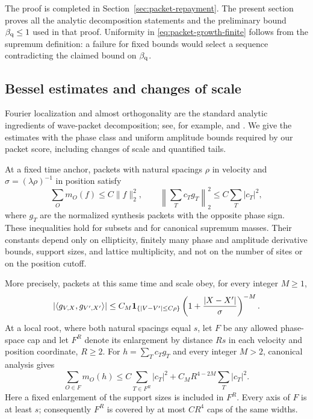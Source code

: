 The proof is completed in Section~\ref{sec:packet-repayment}.
The present section proves all the analytic decomposition statements
and the preliminary bound \(\beta_{\mathrm q}\le1\) used in that proof.
Uniformity in \eqref{eq:packet-growth-finite} follows from the supremum
definition: a failure for fixed bounds would select a sequence
contradicting the claimed bound on \(\beta_{\mathrm q}\).

\subsection{Bessel estimates and changes of scale}

Fourier localization and almost orthogonality are the standard analytic
ingredients of wave-packet decomposition; see, for example,
\citet{Tao2003} and
\citet{GuoOhWangWuZhang2025}. We give the estimates
with the phase class and uniform amplitude bounds required by our
packet score, including changes of scale and quantified tails.

\begin{lemma}
\label{lem:packet-bessel}
At a fixed time anchor, packets with natural spacings \(\rho\) in
velocity and \(\sigma=(\lambda\rho)^{-1}\) in position satisfy
\begin{equation}
 \sum_O m_O(f)\le C\|f\|_2^2,\qquad
 \left\|\sum_T c_T g_T\right\|_2^2\le C\sum_T|c_T|^2,
 \label{eq:packet-bessel}
\end{equation}
where \(g_T\) are the normalized synthesis packets with the opposite
phase sign.  These inequalities hold for subsets and for canonical
supremum masses.  Their constants depend only on ellipticity, finitely
many phase and amplitude derivative bounds, support sizes, and lattice
multiplicity, and not on the number of sites or on the position cutoff.

More precisely, packets at this same time and scale obey, for every
integer \(M\ge1\),
\begin{equation}
 |\langle g_{V,X},g_{V',X'}\rangle|
 \le C_M\mathbf 1_{\{|V-V'|\le C\rho\}}
       \left(1+\frac{|X-X'|}{\sigma}\right)^{-M}.
 \label{eq:packet-gram}
\end{equation}
At a local root, where both natural spacings equal \(s\), let \(F\)
be any allowed phase-space cap and let \(F^R\) denote its enlargement
by distance \(Rs\) in each velocity and position coordinate,
\(R\ge2\).  For \(h=\sum_Tc_Tg_T\) and every integer \(M>2\),
canonical analysis gives
\begin{equation}
 \sum_{O\in F}m_O(h)
 \le C\sum_{T\in F^R}|c_T|^2
       +C_M R^{4-2M}\sum_T|c_T|^2.
 \label{eq:packet-cap-bessel}
\end{equation}
Here a fixed enlargement of the support sizes is included in \(F^R\).
Every axis of \(F\) is at least \(s\); consequently \(F^R\) is covered
by at most \(CR^4\) caps of the same widths.
\end{lemma}

